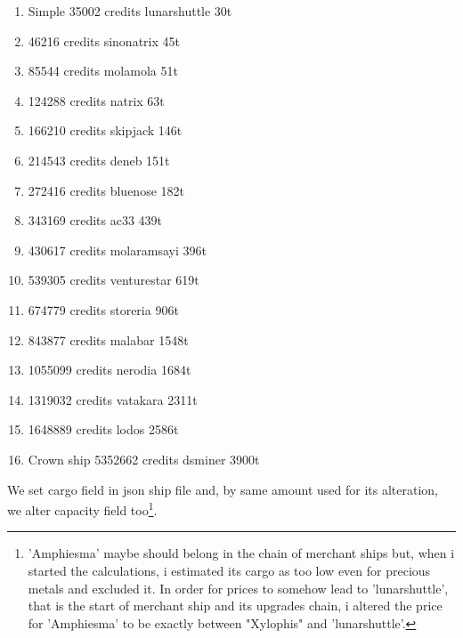 \documentclass[]{article}
\begin{document}
\begin{enumerate}[label=\Roman*,start=0]
\item 	Simple 35002 credits lunarshuttle	30t
	\item 46216 credits	sinonatrix	45t
		\item 85544 credits	molamola	51t		
		\item 124288 credits	natrix	63t
	\item 166210  credits	skipjack	146t
	\item 214543 credits	deneb	151t			
	\item 272416 credits	bluenose	182t		
	\item 343169  credits	ac33	439t
\item 430617 credits	molaramsayi	396t	
	\item 539305  credits	venturestar	619t
	\item 674779 credits	storeria	906t	
	\item 843877 credits	malabar	1548t
	\item  1055099 credits	nerodia	1684t
	\item  1319032 credits	vatakara	2311t				
	\item 1648889 credits	lodos	2586t			
	\item Crown ship 5352662 credits dsminer	3900t
\end{enumerate}

We set cargo field in json ship file and, by same amount used for its alteration, we alter capacity field too\footnote{\nopagebreak'Amphiesma' maybe should belong in the chain of merchant ships but, when i started the calculations, i estimated its cargo as too low even for precious metals and excluded it. In order for prices to somehow lead to 'lunarshuttle', that is the start of merchant ship and its upgrades chain, i altered the price for 'Amphiesma' to be exactly between "Xylophis" and 'lunarshuttle'.  }. 
\end{document}
